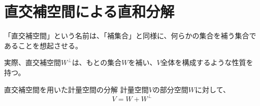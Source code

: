 \documentclass[../../../topic_linear-algebra]{subfiles}
\begin{document}
\sectionline
\section{直交補空間による直和分解}

「直交補空間」という名前は、「補集合」と同様に、何らかの集合を補う集合であることを想起させる。

実際、直交補空間$W^\perp$は、もとの集合$W$を補い、$V$全体を構成するような性質を持つ。

\br

\begin{theorem}{直交補空間を用いた計量空間の分解}
  計量空間$V$の部分空間$W$に対して、
  \begin{equation*}
    V = W + W^\perp
  \end{equation*}
\end{theorem}
\end{document}
